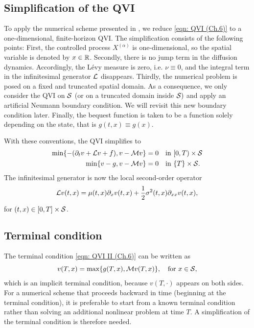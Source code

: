 \subsection{Simplification of the QVI}
\label{section: Simplification of the QVI}
To apply the numerical scheme presented in \cite{azimzadeh2018impulsecontrolfinancenumerical}, we reduce \eqref{eqn: QVI (Ch.6)} to a one-dimensional, finite-horizon QVI. The simplification consists of the following points: First, the controlled process $X^{(\alpha)}$ is one-dimensional, so the spatial variable is denoted by $x \in \mathbb{R}$. Secondly, there is no jump term in the diffusion dynamics. Accordingly, the Lévy measure is zero, i.e. $\nu \equiv 0$, and the integral term in the infinitesimal generator $\mathcal{L}$ disappears. Thirdly, the numerical problem is posed on a fixed and truncated spatial domain. As a consequence, we only consider the QVI on $\mathcal{S}$ (or on a truncated domain inside $\mathcal{S})$ and apply an artificial Neumann boundary condition. We will revisit this new boundary condition later. Finally, the bequest function is taken to be a function solely depending on the state, that is $g(t,x) \equiv g(x)$. 

With these conventions, the QVI simplifies to
 \begin{align}
     \min \{ -(\partial_t v + \mathcal{L} v + f), v - \mathcal{M} v \} = 0 & \quad \text{in } [0,T) \times \mathcal{S} \label{eqn: QVI I (Ch.6)} \\
     \min \{v - g, v - \mathcal{M} v\} = 0 &  \quad \text{in } \{T\} \times \mathcal{S} \label{eqn: QVI II (Ch.6)}.
 \end{align}
The infinitesimal generator is now the local second-order operator
 \begin{equation*}
     \mathcal{L} v (t,x) = \mu(t,x) \partial_x v(t,x) + \frac{1}{2} \sigma^2(t,x) \partial_{xx} v(t,x),  
 \end{equation*}
 for $(t,x) \in [0,T] \times \mathcal{S}$. 

\subsection{Terminal condition}
\label{section: Terminal condition}
The terminal condition \eqref{eqn: QVI II (Ch.6)} can be written as
\begin{equation}
    v(T,x) = \max \{ g(T,x), \mathcal{M} v(T,x) \}, \quad \text{for } x \in \mathcal{S},
    \label{eqn: (2.1) in Azimzadeh}
\end{equation}
which is an implicit terminal condition, because $v(T,\cdot)$ appears on both sides. For a numerical scheme that proceeds backward in time (beginning at the terminal condition), it is preferable to start from a known terminal condition rather than solving an additional nonlinear problem at time $T$. A simplification of the terminal condition is therefore needed. 

